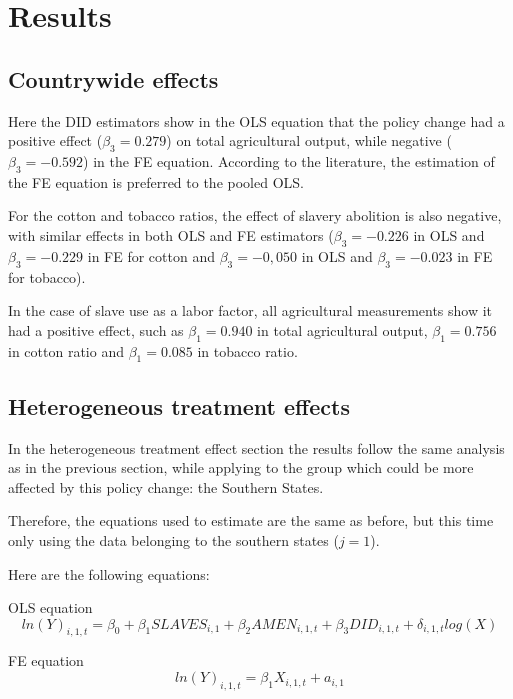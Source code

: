 \documentclass[11pt]{beamer}
\begin{document}
\section{Results}
\subsection{Countrywide effects}
\begin{frame}
Here the DID estimators show in the OLS equation that the policy change had a positive effect ($\beta_{3}=0.279$) on total agricultural output, while negative ($\beta_{3}=-0.592$) in the FE equation. According to the literature, the estimation of the FE equation is preferred to the pooled OLS. 

\vspace{\baselineskip}
For the cotton and tobacco ratios, the effect of slavery abolition is also negative, with similar effects in both OLS and FE estimators ($\beta_{3}=-0.226$ in OLS and $\beta_{3}=-0.229$ in FE for cotton and $\beta_{3}=-0,050$ in OLS and $\beta_{3}=-0.023$ in FE for tobacco).

\vspace{\baselineskip}
In the case of slave use as a labor factor, all agricultural measurements show it had a positive effect, such as $\beta_{1}=0.940$ in total agricultural output, $\beta_{1}=0.756$ in cotton ratio and $\beta_{1}=0.085$ in tobacco ratio.
\end{frame}

\subsection{Heterogeneous treatment effects}
\begin{frame}[allowframebreaks]
In the heterogeneous treatment effect section the results follow the same analysis as in the previous section, while applying to the group which could be more affected by this policy change: the Southern States.

\vspace{\baselineskip}
Therefore, the equations used to estimate are the same as before, but this time only using the data belonging to the southern states ($j=1$).
\end{frame}

\begin{frame}
Here are the following equations:
\begin{block}{OLS equation}
\begin{equation}
ln(Y)_{i,1,t}=\beta_{0}+\beta_{1}SLAVES_{i,1}+\beta_{2}AMEN_{i,1,t}+\beta_{3}DID_{i,1,t}+\delta_{i,1,t}log(X)
\end{equation}
\end{block}
\begin{block}{FE equation}
\begin{equation}
ln(Y)_{i,1,t}=\beta_{1}X_{i,1,t} + a_{i,1}
\end{equation}
\end{block}
\end{frame}
\end{document}
